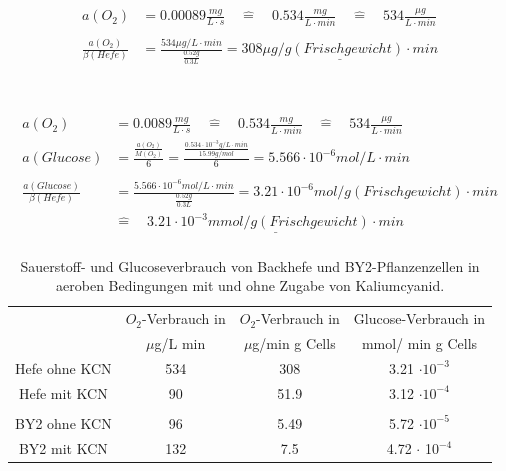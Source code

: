 \documentclass[10pt,a4paper]{article}
\begin{document}
		\begin{equation}\label{eq: Sauerstoffverbrauch}
			\begin{split}
				a(O_2)  &= 0.00089 \frac{mg}{L \cdot s} \quad\widehat{=} \quad 0.534 \frac{mg}{L \cdot min} \quad\widehat{=} \quad 534 \frac{\mu g}{L \cdot min}\\		
				\\
				\frac{a(O_2) }{\beta(Hefe)} &= \frac{534 \mu g/L \cdot min}{\frac{0.52 g}{0.3 L}} = \underline{308 \mu g/g(Frischgewicht)\cdot min}\\
			\end{split}
		\end{equation}
		\\
		\\
		\begin{equation}\label{eq: Glucoseverbrauch}
			\begin{split}
				a(O_2) &= 0.0089 \frac{mg}{L \cdot s} \quad\widehat{=} \quad 0.534 \frac{mg}{L \cdot min} \quad\widehat{=} \quad 534 \frac{\mu g}{L \cdot min}\\		
				a(Glucose) &= \frac{\frac{a(O_2) }{M(O_2)}}{6} = \frac{\frac{0.534 \cdot 10^{-3} g/ L \cdot min}{15.99 g/mol}}{6} = 5.566 \cdot 10^{-6} mol/ L \cdot min \\	
				\\
				\frac{a(Glucose) }{\beta(Hefe)} &= \frac{5.566 \cdot 10^{-6} mol/ L \cdot min}{\frac{0.52 g}{0.3 L}} = 3.21 \cdot 10 ^{-6} mol/g(Frischgewicht) \cdot min \\
				&\widehat{=} \quad \underline{3.21 \cdot 10^{-3} mmol/g(Frischgewicht) \cdot min}\\
			\end{split}
		\end{equation}
	

		\begin{table}[H]
			\centering
			\caption{Sauerstoff- und Glucoseverbrauch von Backhefe und BY2-Pflanzenzellen in aeroben Bedingungen mit und ohne Zugabe von Kaliumcyanid.}
			\label{tab:O2verbrauch und CN}
			\begin{tabular}{cccc}
				\toprule
				&  $O_2$-Verbrauch in & $O_2$-Verbrauch in& Glucose-Verbrauch in\\
				& $\mu$g/L min & $\mu$g/min g Cells &  mmol/ min g Cells\\
				\midrule
				Hefe ohne KCN & 534 & 308 & 3.21 $\cdot 10 ^{-3}$\\
				Hefe mit KCN & 90& 51.9 & 3.12 $\cdot 10 ^{-4}$\\
				& & &\\
				BY2 ohne KCN & 96 & 5.49 & 5.72 $\cdot 10 ^{-5}$\\
				BY2 mit KCN & 132& 7.5 & 4.72 $\cdot$ 10$^{-4}$\\
				\bottomrule
			\end{tabular}
		\end{table}		
	
\end{document}
